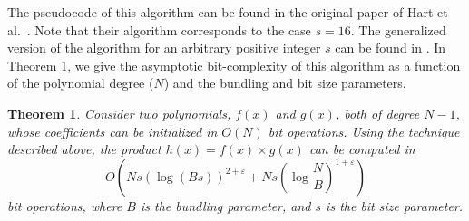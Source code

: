 \documentclass{mcom-l}
\newtheorem{thm}{Theorem}[section]
\theoremstyle{definition}
\begin{document}
The pseudocode of this algorithm can be found in the original paper of
Hart et al.\ \cite[Section 4.1]{hart}. Note that their algorithm
corresponds to the case $s = 16$. The generalized version of the
algorithm for an arbitrary positive integer $s$ can be found in
\cite[Section 4.2]{mosunov1}. In Theorem \ref{thm:complexity1}, we
give the asymptotic bit-complexity of this algorithm as a function of
the polynomial degree ($N$) and the bundling and bit size parameters.
\begin{thm} \label{thm:complexity1}
Consider two polynomials, $f(x)$ and $g(x)$, both of degree $N - 1$,
whose coefficients can be initialized in $O(N)$ bit operations. Using
the technique described above, the product $h(x) = f(x) \times g(x)$
can be computed in
\begin{equation} \label{eq:o1}
O\left(Ns\left(\log(Bs)\right)^{2+\varepsilon} + Ns\left(\log \frac{N}{B}\right)^{1+\varepsilon}\right)
\end{equation}
bit operations, where $B$ is the bundling parameter, and $s$ is the
bit size parameter.
\end{thm}
\end{document}
